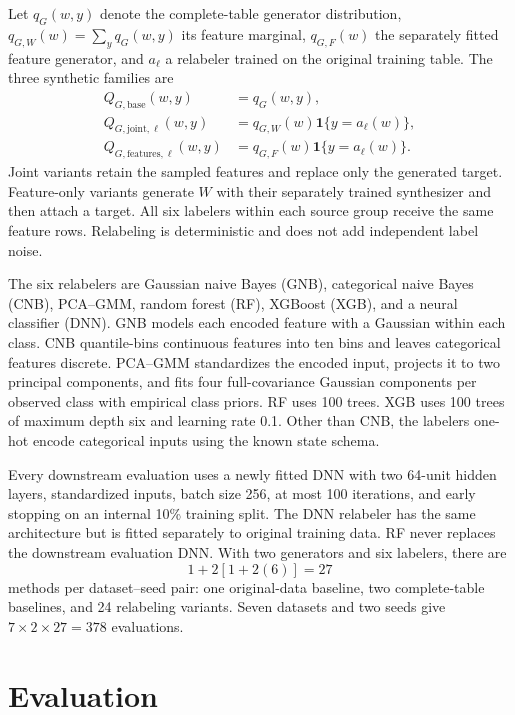 \documentclass[11pt,letterpaper]{article}
\newcommand{\ind}{\mathbf{1}}
\begin{document}
Let $q_G(w,y)$ denote the complete-table generator distribution, $q_{G,W}(w)=\sum_y q_G(w,y)$ its feature marginal, $q_{G,F}(w)$ the separately fitted feature generator, and $a_\ell$ a relabeler trained on the original training table. The three synthetic families are
\begin{align}
 Q_{G,\mathrm{base}}(w,y)&=q_G(w,y),\\
 Q_{G,\mathrm{joint},\ell}(w,y)&=q_{G,W}(w)\ind\{y=a_\ell(w)\},\\
 Q_{G,\mathrm{features},\ell}(w,y)&=q_{G,F}(w)\ind\{y=a_\ell(w)\}.
 \label{eq:families}
\end{align}
Joint variants retain the sampled features and replace only the generated target. Feature-only variants generate $W$ with their separately trained synthesizer and then attach a target. All six labelers within each source group receive the same feature rows. Relabeling is deterministic and does not add independent label noise.

The six relabelers are Gaussian naive Bayes (GNB), categorical naive Bayes (CNB), PCA--GMM, random forest (RF), XGBoost (XGB), and a neural classifier (DNN). GNB models each encoded feature with a Gaussian within each class. CNB quantile-bins continuous features into ten bins and leaves categorical features discrete. PCA--GMM standardizes the encoded input, projects it to two principal components, and fits four full-covariance Gaussian components per observed class with empirical class priors. RF uses 100 trees. XGB uses 100 trees of maximum depth six and learning rate 0.1. Other than CNB, the labelers one-hot encode categorical inputs using the known state schema.

Every downstream evaluation uses a newly fitted DNN with two 64-unit hidden layers, standardized inputs, batch size 256, at most 100 iterations, and early stopping on an internal 10\% training split. The DNN relabeler has the same architecture but is fitted separately to original training data. RF never replaces the downstream evaluation DNN. With two generators and six labelers, there are
\begin{equation}
 1+2[1+2(6)]=27
\end{equation}
methods per dataset--seed pair: one original-data baseline, two complete-table baselines, and 24 relabeling variants. Seven datasets and two seeds give $7\times2\times27=378$ evaluations.

\section{Evaluation}
\end{document}
